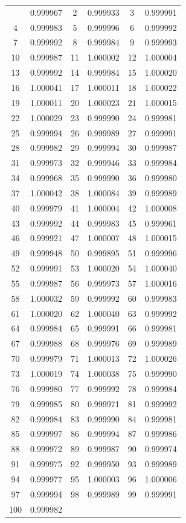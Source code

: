 \documentclass[12pt]{article}
\begin{document}
\begin{longtable}{@{}cc|cc|cc@{}}
\bottomrule
\endlastfoot
1 & 0.999967 & 2 & 0.999933 & 3 & 0.999991 \\
4 & 0.999983 & 5 & 0.999996 & 6 & 0.999992 \\
7 & 0.999992 & 8 & 0.999984 & 9 & 0.999993 \\
10 & 0.999987 & 11 & 1.000002 & 12 & 1.000004 \\
13 & 0.999992 & 14 & 0.999984 & 15 & 1.000020 \\
16 & 1.000041 & 17 & 1.000011 & 18 & 1.000022 \\
19 & 1.000011 & 20 & 1.000023 & 21 & 1.000015 \\
22 & 1.000029 & 23 & 0.999990 & 24 & 0.999981 \\
25 & 0.999994 & 26 & 0.999989 & 27 & 0.999991 \\
28 & 0.999982 & 29 & 0.999994 & 30 & 0.999987 \\
31 & 0.999973 & 32 & 0.999946 & 33 & 0.999984 \\
34 & 0.999968 & 35 & 0.999990 & 36 & 0.999980 \\
37 & 1.000042 & 38 & 1.000084 & 39 & 0.999989 \\
40 & 0.999979 & 41 & 1.000004 & 42 & 1.000008 \\
43 & 0.999992 & 44 & 0.999983 & 45 & 0.999961 \\
46 & 0.999921 & 47 & 1.000007 & 48 & 1.000015 \\
49 & 0.999948 & 50 & 0.999895 & 51 & 0.999996 \\
52 & 0.999991 & 53 & 1.000020 & 54 & 1.000040 \\
55 & 0.999987 & 56 & 0.999973 & 57 & 1.000016 \\
58 & 1.000032 & 59 & 0.999992 & 60 & 0.999983 \\
61 & 1.000020 & 62 & 1.000040 & 63 & 0.999992 \\
64 & 0.999984 & 65 & 0.999991 & 66 & 0.999981 \\
67 & 0.999988 & 68 & 0.999976 & 69 & 0.999989 \\
70 & 0.999979 & 71 & 1.000013 & 72 & 1.000026 \\
73 & 1.000019 & 74 & 1.000038 & 75 & 0.999990 \\
76 & 0.999980 & 77 & 0.999992 & 78 & 0.999984 \\
79 & 0.999985 & 80 & 0.999971 & 81 & 0.999992 \\
82 & 0.999984 & 83 & 0.999990 & 84 & 0.999981 \\
85 & 0.999997 & 86 & 0.999994 & 87 & 0.999986 \\
88 & 0.999972 & 89 & 0.999987 & 90 & 0.999974 \\
91 & 0.999975 & 92 & 0.999950 & 93 & 0.999989 \\
94 & 0.999977 & 95 & 1.000003 & 96 & 1.000006 \\
97 & 0.999994 & 98 & 0.999989 & 99 & 0.999991 \\
100 & 0.999982 &  &  &  &  \\

\end{longtable}
\end{document}

